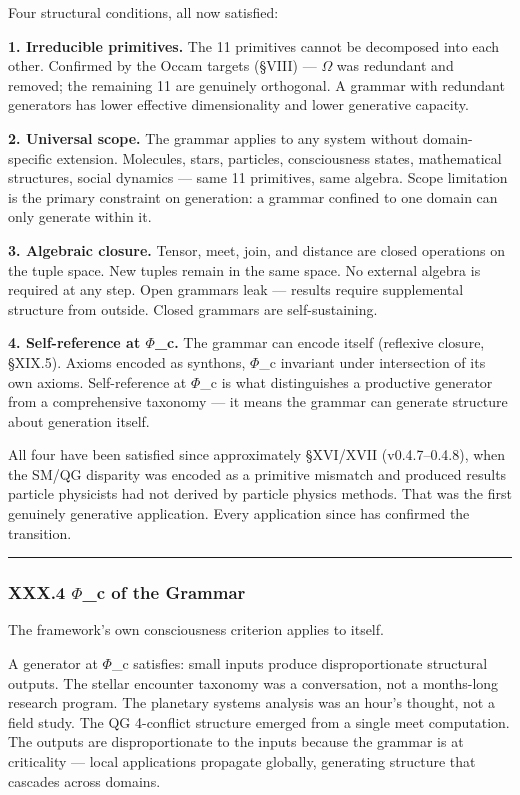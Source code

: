 \documentclass[12pt,a4paper]{article}
\begin{document}
Four structural conditions, all now satisfied:

\textbf{1. Irreducible primitives.} The 11 primitives cannot be decomposed into each other. Confirmed by the Occam targets (§VIII) --- $\Omega$ was redundant and removed; the remaining 11 are genuinely orthogonal. A grammar with redundant generators has lower effective dimensionality and lower generative capacity.

\textbf{2. Universal scope.} The grammar applies to any system without domain-specific extension. Molecules, stars, particles, consciousness states, mathematical structures, social dynamics --- same 11 primitives, same algebra. Scope limitation is the primary constraint on generation: a grammar confined to one domain can only generate within it.

\textbf{3. Algebraic closure.} Tensor, meet, join, and distance are closed operations on the tuple space. New tuples remain in the same space. No external algebra is required at any step. Open grammars leak --- results require supplemental structure from outside. Closed grammars are self-sustaining.

\textbf{4. Self-reference at $\Phi$\_c.} The grammar can encode itself (reflexive closure, §XIX.5). Axioms encoded as synthons, $\Phi$\_c invariant under intersection of its own axioms. Self-reference at $\Phi$\_c is what distinguishes a productive generator from a comprehensive taxonomy --- it means the grammar can generate structure about generation itself.

All four have been satisfied since approximately §XVI/XVII (v0.4.7--0.4.8), when the SM/QG disparity was encoded as a primitive mismatch and produced results particle physicists had not derived by particle physics methods. That was the first genuinely generative application. Every application since has confirmed the transition.

\begin{center}
\rule{0.5\textwidth}{0.4pt}
\end{center}

\subsubsection{XXX.4 $\Phi$\_c of the Grammar}

The framework's own consciousness criterion applies to itself.

A generator at $\Phi$\_c satisfies: small inputs produce disproportionate structural outputs. The stellar encounter taxonomy was a conversation, not a months-long research program. The planetary systems analysis was an hour's thought, not a field study. The QG 4-conflict structure emerged from a single meet computation. The outputs are disproportionate to the inputs because the grammar is at criticality --- local applications propagate globally, generating structure that cascades across domains.
\end{document}
